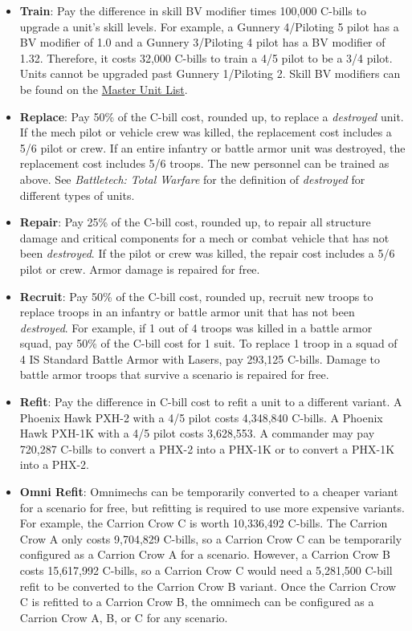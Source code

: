 \documentclass[UTF8]{article}
\begin{document}
\begin{itemize}

\item {\bf Train}: Pay the difference in skill BV modifier times 100,000 C-bills to upgrade a unit's skill levels.
For example, a Gunnery 4/Piloting 5 pilot has a BV modifier of 1.0 and a Gunnery 3/Piloting 4 pilot has a BV modifier of 1.32.
Therefore, it costs 32,000 C-bills to train a 4/5 pilot to be a 3/4 pilot.
Units cannot be upgraded past Gunnery 1/Piloting 2.
Skill BV modifiers can be found on the \href{http://www.masterunitlist.info/}{Master Unit List}.

\item {\bf Replace}: Pay 50\% of the C-bill cost, rounded up, to replace a \emph{destroyed} unit.
If the mech pilot or vehicle crew was killed, the replacement cost includes a 5/6 pilot or crew.
If an entire infantry or battle armor unit was destroyed, the replacement cost includes 5/6 troops.
The new personnel can be trained as above.
See \emph{Battletech: Total Warfare} for the definition of \emph{destroyed} for different types of units.

\item {\bf Repair}: Pay 25\% of the C-bill cost, rounded up, to repair all structure damage and critical components for a mech or combat vehicle that has not been \emph{destroyed}.
If the pilot or crew was killed, the repair cost includes a 5/6 pilot or crew.
Armor damage is repaired for free.

\item {\bf Recruit}: Pay 50\% of the C-bill cost, rounded up, recruit new troops to replace troops in an infantry or battle armor unit that has not been \emph{destroyed}.
For example, if 1 out of 4 troops was killed in a battle armor squad, pay 50\% of the C-bill cost for 1 suit.
To replace 1 troop in a squad of 4 IS Standard Battle Armor with Lasers, pay 293,125 C-bills.
Damage to battle armor troops that survive a scenario is repaired for free.

\item {\bf Refit}: Pay the difference in C-bill cost to refit a unit to a different variant.
A Phoenix Hawk PXH-2 with a 4/5 pilot costs 4,348,840 C-bills.
A Phoenix Hawk PXH-1K with a 4/5 pilot costs 3,628,553.
A commander may pay 720,287 C-bills to convert a PHX-2 into a PHX-1K or to convert a PHX-1K into a PHX-2.

\item {\bf Omni Refit}: Omnimechs can be temporarily converted to a cheaper variant for a scenario for free, but refitting is required to use more expensive variants.
For example, the Carrion Crow C is worth 10,336,492 C-bills.
The Carrion Crow A only costs 9,704,829 C-bills, so a Carrion Crow C can be temporarily configured as a Carrion Crow A for a scenario.
However, a Carrion Crow B costs 15,617,992 C-bills, so a Carrion Crow C would need a 5,281,500 C-bill refit to be converted to the Carrion Crow B variant.
Once the Carrion Crow C is refitted to a Carrion Crow B, the omnimech can be configured as a Carrion Crow A, B, or C for any scenario.


\end{itemize}
\end{document}
